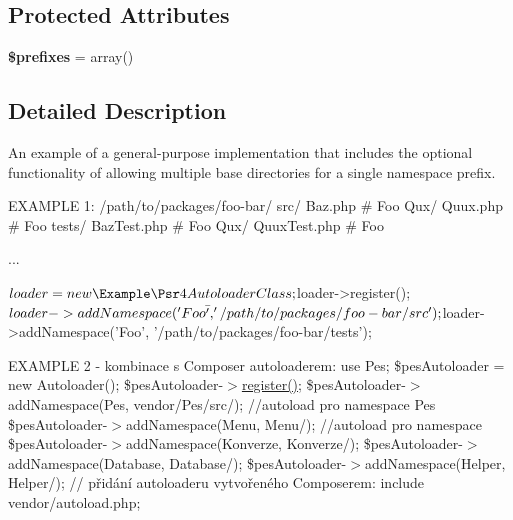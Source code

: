 \subsection*{Protected Attributes}
\begin{DoxyCompactItemize}
\item 
\mbox{\label{class_pes_1_1_autoloader_1_1_autoloader_a8dd2685d77e3731afd50eaa21c4f2055}} 
{\bfseries \$prefixes} = array()
\end{DoxyCompactItemize}


\subsection{Detailed Description}
An example of a general-\/purpose implementation that includes the optional functionality of allowing multiple base directories for a single namespace prefix.

E\+X\+A\+M\+P\+LE 1\+: /path/to/packages/foo-\/bar/ src/ Baz.\+php \# Foo Qux/ Quux.\+php \# Foo tests/ Baz\+Test.\+php \# Foo Qux/ Quux\+Test.\+php \# Foo

... \begin{DoxyVerb} $loader = new \Example\Psr4AutoloaderClass;
 $loader->register();
 $loader->addNamespace('Foo\Bar', '/path/to/packages/foo-bar/src');
 $loader->addNamespace('Foo\Bar', '/path/to/packages/foo-bar/tests');
\end{DoxyVerb}


E\+X\+A\+M\+P\+LE 2 -\/ kombinace s Composer autoloaderem\+: use Pes; \$pes\+Autoloader = new Autoloader(); \$pes\+Autoloader-\/$>$\mbox{\hyperlink{class_pes_1_1_autoloader_1_1_autoloader_acc294a6cc8e69743746820e3d15e3f78}{register()}}; \$pes\+Autoloader-\/$>$add\+Namespace(\textquotesingle{}Pes\textquotesingle{}, \textquotesingle{}vendor/\+Pes/src/\textquotesingle{}); //autoload pro namespace Pes \$pes\+Autoloader-\/$>$add\+Namespace(\textquotesingle{}Menu\textquotesingle{}, \textquotesingle{}Menu/\textquotesingle{}); //autoload pro namespace \$pes\+Autoloader-\/$>$add\+Namespace(\textquotesingle{}Konverze\textquotesingle{}, \textquotesingle{}Konverze/\textquotesingle{}); \$pes\+Autoloader-\/$>$add\+Namespace(\textquotesingle{}Database\textquotesingle{}, \textquotesingle{}Database/\textquotesingle{}); \$pes\+Autoloader-\/$>$add\+Namespace(\textquotesingle{}Helper\textquotesingle{}, \textquotesingle{}Helper/\textquotesingle{}); // přidání autoloaderu vytvořeného Composerem\+: include \textquotesingle{}vendor/autoload.\+php\textquotesingle{}; 


